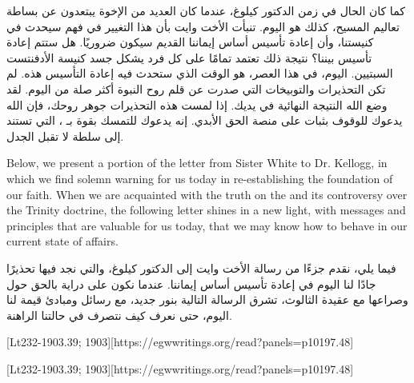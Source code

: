 كما كان الحال في زمن الدكتور كيلوغ، عندما كان العديد من الإخوة يبتعدون عن بساطة تعاليم المسيح، كذلك هو اليوم. تنبأت الأخت وايت بأن هذا التغيير في فهم  سيحدث في كنيستنا، وأن إعادة تأسيس أساس إيماننا القديم سيكون ضروريًا. هل ستتم إعادة تأسيس  بيننا؟ نتيجة ذلك تعتمد تمامًا على كل فرد يشكل جسد كنيسة الأدفنتست السبتيين. اليوم، في هذا العصر، هو الوقت الذي ستحدث فيه إعادة التأسيس هذه. لم تكن التحذيرات والتوبيخات التي صدرت عن قلم روح النبوة أكثر صلة من اليوم. لقد وضع الله النتيجة النهائية في يديك. إذا لمست هذه التحذيرات جوهر روحك، فإن الله يدعوك للوقوف بثبات على منصة الحق الأبدي. إنه يدعوك للتمسك بقوة بـ ، التي تستند إلى سلطة لا تقبل الجدل.


Below, we present a portion of the letter from Sister White to Dr. Kellogg, in which we find solemn warning for us today in re-establishing the foundation of our faith. When we are acquainted with the truth on the  and its controversy over the Trinity doctrine, the following letter shines in a new light, with messages and principles that are valuable for us today, that we may know how to behave in our current state of affairs.


فيما يلي، نقدم جزءًا من رسالة الأخت وايت إلى الدكتور كيلوغ، والتي نجد فيها تحذيرًا جادًا لنا اليوم في إعادة تأسيس أساس إيماننا. عندما نكون على دراية بالحق حول  وصراعها مع عقيدة الثالوث، تشرق الرسالة التالية بنور جديد، مع رسائل ومبادئ قيمة لنا اليوم، حتى نعرف كيف نتصرف في حالتنا الراهنة.






[Lt232-1903.39; 1903][https://egwwritings.org/read?panels=p10197.48]


[Lt232-1903.39; 1903][https://egwwritings.org/read?panels=p10197.48]



